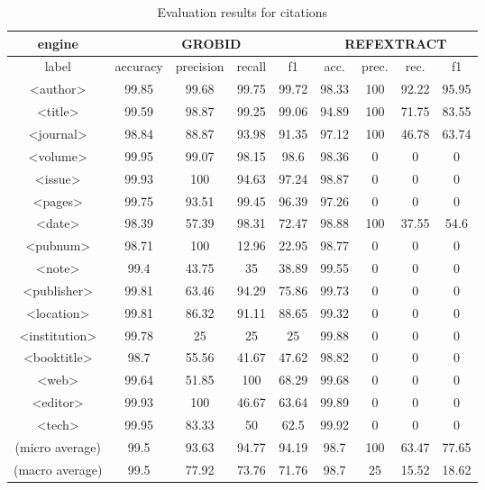 \begin{table}[h]
\begin{center}
\begin{tabular}{|c|cccc|cccc|}
\hline
engine &  \multicolumn{4}{c}{GROBID} & \multicolumn{4}{c}{REFEXTRACT}\\
\hline
label & accuracy & precision & recall & f1 & acc. & prec. & rec. & f1\\
\hline
<author>	&	99.85	&	99.68	&	99.75	&	99.72 	& 98.33	&	100	&	92.22	&	95.95	\\
<title>	&	99.59	&	98.87	&	99.25	&	99.06 	& 94.89	&	100	&	71.75	&	83.55	\\
<journal>	&	98.84	&	88.87	&	93.98	&	91.35 	& 97.12	&	100	&	46.78	&	63.74	\\
<volume>&	99.95	&	99.07	&	98.15	&	98.6 		& 98.36	&	0	&	0		&	0	\\
<issue>	&	99.93	&	100		&	94.63	&	97.24	 & 98.87	&	0	&	0		&	0	\\
<pages>	&	99.75	&	93.51	&	99.45	&	96.39 	& 97.26	&	0	&	0		&	0	\\
<date>	&	98.39	&	57.39	&	98.31	&	72.47 	& 98.88	&	100	&	37.55	&	54.6	\\
<pubnum>&	98.71	&	100		&	12.96	&	22.95 	& 98.77	&	0	&	0		&	0	\\
<note>	&	99.4	 	&	43.75	&	35		&	38.89 	& 99.55	&	0	&	0		&	0	\\
<publisher>&	99.81	&	63.46	&	94.29	&	75.86 	& 99.73	&	0	&	0		&	0	\\
<location>&	99.81	&	86.32	&	91.11	&	88.65 	& 99.32	&	0	&	0		&	0	\\
<institution>&	99.78	&	25		&	25		&	25 		& 99.88	&	0	&	0		&	0	\\
<booktitle>&	98.7		&	55.56	&	41.67	&	47.62 	& 98.82	&	0	&	0		&	0	\\
<web>	&	99.64	&	51.85	&	100		&	68.29 	& 99.68	&	0	&	0		&	0	\\
<editor>	&	99.93	&	100		&46.67		&	63.64 	& 99.89	&	0	&	0		&	0	\\
<tech>	&	99.95	&	83.33	&	50		&	62.5 		& 99.92	&	0	&	0		&	0	\\
\hline
(micro average) & 99.5	&	93.63	&	94.77 	&	94.19 & 98.7	&	100	&	63.47 	&	77.65	\\
(macro average) & 99.5	&	77.92	&	73.76	&	71.76 & 98.7	&	25	&	15.52	&	18.62	\\
\hline
\end{tabular}
\caption[Evaluation results for citations]{Evaluation results for citations}
\label{table:citationcomparison}
\end{center}
\end{table}
